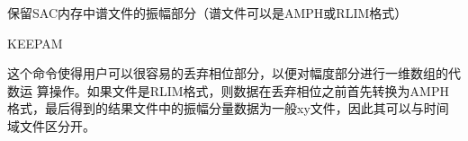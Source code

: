 \label{cmd:keepam}

保留SAC内存中谱文件的振幅部分（谱文件可以是AMPH或RLIM格式）

\begin{SACSTX}
KEEPAM
\end{SACSTX}

这个命令使得用户可以很容易的丢弃相位部分，以便对幅度部分进行一维数组的代数运	算操作。如果文件是RLIM格式，则数据在丢弃相位之前首先转换为AMPH格式，最后得到的结果文件中的振幅分量数据为一般xy文件，因此其可以与时间域文件区分开。

